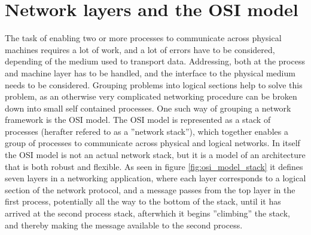 \section{Network layers and the OSI model}
The task of enabling two or more processes to communicate across physical machines requires a lot of work, and a lot of errors have to be considered, depending of the medium used to transport data. Addressing, both at the process and machine layer has to be handled, and the interface to the physical medium needs to be considered. Grouping problems into logical sections help to solve this problem, as an otherwise very complicated networking procedure can be broken down into small self contained processes.
One such way of grouping a network framework is the OSI model. The OSI model is represented as a stack of processes (herafter refered to as a ''network stack''), which together enables a group of processes to communicate across physical and logical networks.
In itself the OSI model is not an actual network stack, but it is a model of an architecture that is both robust and flexible. 
As seen in figure \ref{fig:osi_model_stack} it defines seven layers in a networking application, where each layer corresponds to a logical section of the network protocol, and a message passes from the top layer in the first process, potentially all the way to the bottom of the stack, until it has arrived at the second process stack, afterwhich it begins ''climbing'' the stack, and thereby making the message available to the second process.

